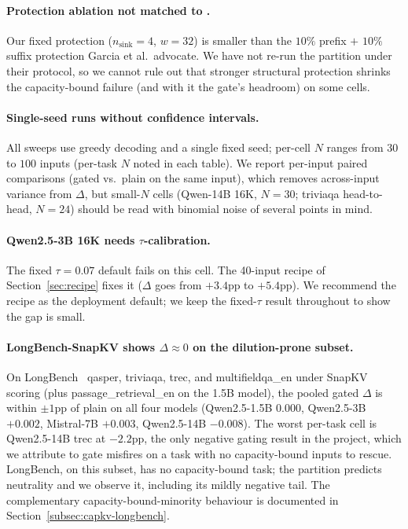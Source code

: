 \documentclass{article} %
\begin{document}
\paragraph{Protection ablation not matched to \citet{arxiv260518053}.}
Our fixed protection ($n_{\text{sink}} = 4$, $w = 32$) is smaller than
the $10\%$ prefix $+$ $10\%$ suffix protection Garcia et al.\ advocate.
We have not re-run the partition under their protocol, so we cannot
rule out that stronger structural protection shrinks the capacity-bound
failure (and with it the gate's headroom) on some cells.

\paragraph{Single-seed runs without confidence intervals.} All sweeps
use greedy decoding and a single fixed seed; per-cell $N$ ranges from
$30$ to $100$ inputs (per-task $N$ noted in each table). We report
per-input paired comparisons (gated vs.\ plain on the same input),
which removes across-input variance from $\Delta$, but small-$N$ cells
(Qwen-14B 16K, $N = 30$; triviaqa head-to-head, $N = 24$) should be
read with binomial noise of several points in mind.

\paragraph{Qwen2.5-3B 16K needs $\tau$-calibration.} The fixed
$\tau = 0.07$ default fails on this cell. The 40-input recipe of
Section~\ref{sec:recipe} fixes it ($\Delta$ goes from $+3.4$pp to
$+5.4$pp). We recommend the recipe as the deployment default; we keep
the fixed-$\tau$ result throughout to show the gap is small.

\paragraph{LongBench-SnapKV shows $\Delta \approx 0$ on the
dilution-prone subset.} On LongBench~\citep{arxiv230814508} qasper,
triviaqa, trec, and multifieldqa\_en under SnapKV scoring (plus
passage\_retrieval\_en on the 1.5B model), the pooled gated $\Delta$ is
within $\pm 1$pp of plain on all four models (Qwen2.5-1.5B $0.000$,
Qwen2.5-3B $+0.002$, Mistral-7B $+0.003$, Qwen2.5-14B $-0.008$). The
worst per-task cell is Qwen2.5-14B trec at $-2.2$pp, the only negative
gating result in the project, which we attribute to gate misfires on a
task with no capacity-bound inputs to rescue. LongBench, on this
subset, has no capacity-bound task; the partition predicts neutrality
and we observe it, including its mildly negative tail. The
complementary capacity-bound-minority behaviour
is documented in Section~\ref{subsec:capkv-longbench}.
\end{document}
